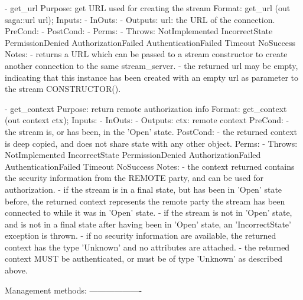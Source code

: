 \begin{myspec}
    - get_url
      Purpose:  get URL used for creating the stream
      Format:   get_url               (out saga::url url);
      Inputs:   -
      InOuts:   -
      Outputs:  url:                  the URL of the connection.
      PreCond:  -
      PostCond: -
      Perms:    -
      Throws:   NotImplemented
                IncorrectState
                PermissionDenied
                AuthorizationFailed
                AuthenticationFailed
                Timeout
                NoSuccess
      Notes:    - returns a URL which can be passed to a
                  stream constructor to create another
                  connection to the same stream_server.
                - the returned url may be empty, indicating that
                  this instance has been created with an empty
                  url as parameter to the stream CONSTRUCTOR().
 
 
    - get_context
      Purpose:  return remote authorization info
      Format:   get_context           (out context ctx);
      Inputs:   -
      InOuts:   -
      Outputs:  ctx:                   remote context
      PreCond:  - the stream is, or has been, in the 'Open' 
                  state.
      PostCond: - the returned context is deep copied, and does
                  not share state with any other object.
      Perms:    -
      Throws:   NotImplemented
                IncorrectState
                PermissionDenied
                AuthorizationFailed
                AuthenticationFailed
                Timeout
                NoSuccess
      Notes:    - the context returned contains the security
                  information from the REMOTE party, and can be 
                  used for authorization.
                - if the stream is in a final state, but has
                  been in 'Open' state before, the returned
                  context represents the remote party the stream
                  has been connected to while it was in 'Open'
                  state.
                - if the stream is not in 'Open' state, and is
                  not in a final state after having been in
                  'Open' state, an 'IncorrectState' exception is
                  thrown.
                - if no security information are available, the
                  returned context has the type 'Unknown' and no
                  attributes are attached.
                - the returned context MUST be authenticated, or
                  must be of type 'Unknown' as described above.
 
 
    Management methods:
    -------------------
 

\end{myspec}
